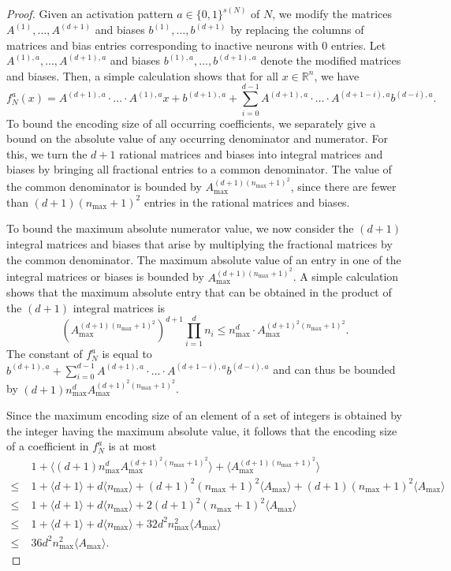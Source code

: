 \documentclass[10pt,a4paper]{amsart}
\begin{document}
\begin{proof}
    Given an activation pattern $a\in \{0,1\}^{s(N)}$ of $N$, we modify the matrices $A^{(1)},\dots, A^{(d+1)}$ and biases $b^{(1)},\dots, b^{(d+1)}$ by replacing the columns of matrices and bias entries corresponding to inactive neurons with 0 entries.
    Let $A^{(1),a},\dots, A^{(d+1),a}$ and biases $b^{(1),a},\dots, b^{(d+1), a}$ denote the modified matrices and biases.
    Then, a simple calculation shows that for all $x\in \mathbb{R}^n$, we have
    \[
    f_N^a(x) = A^{(d+1),a}\cdot \dots \cdot A^{(1),a}x + b^{(d+1), a}+\sum_{i=0}^{d-1}A^{(d+1),a}\cdot \dots \cdot A^{(d+1-i),a}b^{(d-i), a}.
    \]
    To bound the encoding size of all occurring coefficients, we separately give a bound on the absolute value of any occurring denominator and numerator.
    For this, we turn the $d+1$ rational matrices and biases into integral matrices and biases by bringing all fractional entries to a common denominator.
    The value of the common denominator is bounded by $A_{\max}^{(d+1)(n_{\max}+1)^2}$, since there are fewer than $(d+1)(n_{\max}+1)^2$ entries in the rational matrices and biases.

    To bound the maximum absolute numerator value, we now consider the $(d+1)$ integral matrices and biases that arise by multiplying the fractional matrices by the common denominator.
    The maximum absolute value of an entry in one of the integral matrices or biases is bounded by $A_{\max}^{(d+1)(n_{\max}+1)^2}$.
    A simple calculation shows that the maximum absolute entry that can be obtained in the product of the $(d+1)$ integral matrices is
    \[
    \left(A_{\max}^{(d+1)(n_{\max}+1)^2}\right)^{d+1}\prod_{i=1}^{d}n_i
    \leq n_{\max}^d \cdot A_{\max}^{(d+1)^2(n_{\max}+1)^2}.
    \]
    The constant of $f_N^a$ is equal to $b^{(d+1), a}+\sum_{i=0}^{d-1}A^{(d+1),a}\cdot \dots \cdot A^{(d+1-i),a}b^{(d-i), a}$ and can thus be bounded by $(d+1) n_{\max}^d  A_{\max}^{(d+1)^2(n_{\max}+1)^2}$.
    
    Since the maximum encoding size of an element of a set of integers is obtained by the integer having the maximum absolute value, it follows that the encoding size of a coefficient in $f_N^a$ is at most
    \begin{align*}
    &1+\langle (d+1) n_{\max}^d  A_{\max}^{(d+1)^2(n_{\max}+1)^2} \rangle + \langle A_{\max}^{(d+1)(n_{\max}+1)^2} \rangle\\
    \leq\;&1+\langle d + 1 \rangle+d\langle n_{\max}\rangle+(d+1)^2(n_{\max}+1)^2\langle A_{\max}\rangle+(d+1)(n_{\max}+1)^2\langle A_{\max}\rangle\\
    \leq\;&1+\langle d + 1 \rangle+d\langle n_{\max}\rangle+2(d+1)^2(n_{\max}+1)^2\langle A_{\max}\rangle\\
    \leq\;&1+\langle d + 1 \rangle+d\langle n_{\max}\rangle+32d^2n_{\max}^2\langle A_{\max}\rangle\\
    \leq \; & 36d^2n_{\max}^2\langle A_{\max}\rangle.
    \end{align*}
\end{proof}
\end{document}

